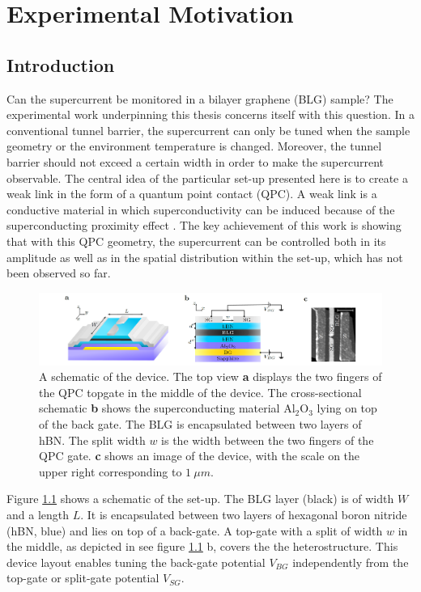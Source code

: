 \chapter{Experimental Motivation}
\label{ch:experiment}

\section{Introduction}
Can the supercurrent be monitored in a bilayer graphene (BLG) sample? The experimental work underpinning this thesis concerns itself with this question. In a conventional tunnel barrier, the supercurrent can only be tuned when the sample geometry or the environment temperature is changed. Moreover, the tunnel barrier should not exceed a certain width in order to make the supercurrent observable. The central idea of the particular set-up presented here is to create a weak link in the form of a quantum point contact (QPC). A weak link is a conductive material in which superconductivity can be induced because of the superconducting proximity effect \cite{Likharev1979}. The key achievement of this work is showing that with this QPC geometry, the supercurrent can be controlled both in its amplitude as well as in the spatial distribution within the set-up, which has not been observed so far.
\begin{figure}[h]
\centering
\includegraphics[width=\textwidth]{figure/experiment/setup}
\caption{A schematic of the device. The top view \textbf{a} displays the two fingers of the QPC topgate in the middle of the device. The cross-sectional schematic \textbf{b} shows the superconducting material $\text{Al}_2\text{O}_3$ lying on top of the back gate. The BLG is encapsulated between two layers of hBN. The split width $w$ is the width between the two fingers of the QPC gate. \textbf{c} shows an image of the device, with the scale on the upper right corresponding to $1\ \mu m$.   }\label{fig:setup}
\end{figure}
Figure \ref{fig:setup} shows a schematic of the set-up. The BLG layer (black) is of width $W$ and a length $L$. It is encapsulated between two layers of hexagonal boron nitride (hBN, blue) and lies on top of a back-gate. A top-gate with a split of width $w$ in the middle, as depicted in see figure \ref{fig:setup} b, covers the the heterostructure. This device layout enables tuning the back-gate potential $V_{BG}$ independently from the top-gate or split-gate potential $V_{SG}$.

